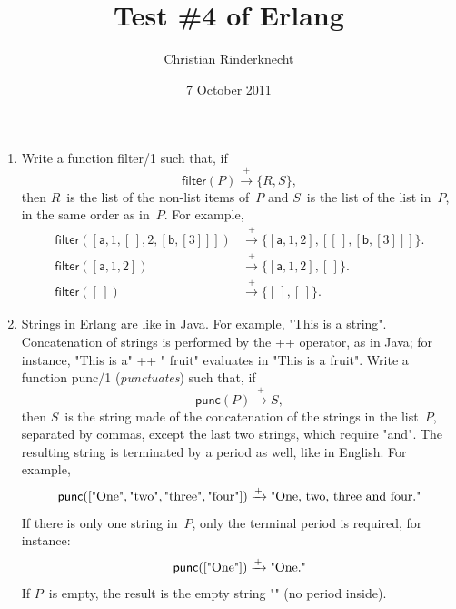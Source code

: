 \documentclass[11pt,a4paper]{article}
\title{Test \#4 of \textsf{Erlang}}
\author{Christian Rinderknecht}
\date{7 October 2011}
\newcommand\fun[1]{\textsf{#1}}
\begin{document}
\maketitle

\thispagestyle{empty}

\begin{enumerate}

  \item Write a function \fun{filter/1} such that, if
    \[\fun{filter}(P) \xrightarrow{+} \{R,S\},\]
    then \(R\)~is the list of the non-list items of~\(P\) and \(S\)~is
    the list of the list in~\(P\), in the same order as in~\(P\). For
    example,
    \begin{align*}
      \fun{filter}([\fun{a},1,[\,],2,[\fun{b},[3]]])
    &\xrightarrow{+} \{[\fun{a},1,2],[[\,],[\fun{b},[3]]]\}.\\
      \fun{filter}([\fun{a},1,2])
    &\xrightarrow{+} \{[\fun{a},1,2],[\,]\}.\\
      \fun{filter}([\,])
    &\xrightarrow{+} \{[\,],[\,]\}.
    \end{align*}

  \item Strings in \textsf{Erlang} are like in \textsf{Java}. For
    example, \fun{"This is a string"}. Concatenation of strings is
    performed by the \fun{++} operator, as in \textsf{Java}; for
    instance, \fun{"This is a" ++ " fruit"} evaluates in \fun{"This is
      a fruit"}. Write a function \fun{punc/1} (\emph{punctuates})
    such that, if
    \[\fun{punc}(P) \xrightarrow{+} S,\]
    then \(S\)~is the string made of the concatenation of the strings
    in the list~\(P\), separated by commas, except the last two
    strings, which require "and". The resulting string is terminated
    by a period as well, like in English. For example,
    \[
    \fun{punc}([\textnormal{"One"}, \textnormal{"two"},
      \textnormal{"three"}, \textnormal{"four"}]) \xrightarrow{+}
    \textnormal{"One, two, three and four."}\] If there is only one
    string in~\(P\), only the terminal period is required, for
    instance:
    \[\fun{punc}([\textnormal{"One"}]) \xrightarrow{+} \textnormal{"One."}\] If \(P\)~is empty,
    the result is the empty string \fun{""} (no period inside).

\end{enumerate}
\end{document}
